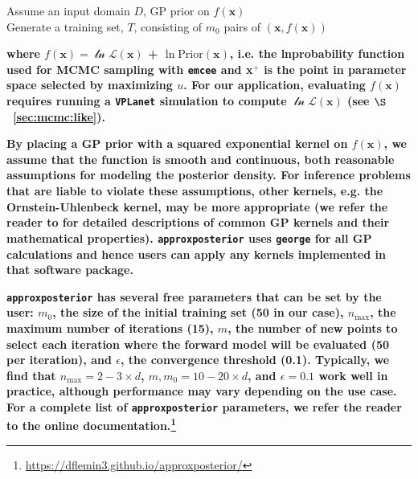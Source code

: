 \documentclass[twocolumn]{aastex62}
\newcommand{\xxx}[1]{{\textbf{#1}}}
\newcommand{\vplanet}[0]{\texttt{VPLanet}\xspace}
\newcommand{\emcee}[0]{\texttt{emcee}\xspace}
\newcommand{\approxposterior}[0]{\texttt{approxposterior}\xspace}
\begin{document}
\begin{algorithm}[H] \label{app:algo}
\SetAlgoLined
 Assume an input domain $D$, GP prior on $f(\textbf{x})$ \\
 Generate a training set, $T$, consisting of $m_0$ pairs of $(\textbf{x}, f(\textbf{x}))$ \\
\caption{\approxposterior Approximate Inference Pseudo Code}
\end{algorithm}
\xxx{where $f(\textbf{x}) = \mathcal{\ln L}(\textbf{x})$ + $\ln \mathrm{Prior}(\textbf{x})$, i.e. the lnprobability function used for MCMC sampling with \emcee and \textbf{x}$^+$ is the point in parameter space selected by maximizing $u$. For our application, evaluating $f(\textbf{x})$ requires running a \vplanet simulation to compute $\mathcal{\ln L}(\textbf{x})$ (see $\S$~\ref{sec:mcmc:like}).} 

\xxx{By placing a GP prior with a squared exponential kernel on $f(\textbf{x})$, we assume that the function is smooth and continuous, both reasonable assumptions for modeling the posterior density. For inference problems that are liable to violate these assumptions, other kernels, e.g. the Ornstein-Uhlenbeck kernel, may be more appropriate (we refer the reader to \citet{Rasmussen2006} for detailed descriptions of common GP kernels and their mathematical properties). \approxposterior uses \texttt{george} \citep{george} for all GP calculations and hence users can apply any kernels implemented in that software package.} 

\xxx{\approxposterior has several free parameters that can be set by the user: $m_0$, the size of the initial training set (50 in our case), $n_{\mathrm{max}}$, the maximum number of iterations (15), $m$, the number of new points to select each iteration where the forward model will be evaluated (50 per iteration), and $\epsilon$, the convergence threshold (0.1). Typically, we find that $n_{\mathrm{max}}=2-3 \times d$, $m, m_0 = 10-20 \times d$, and $\epsilon = 0.1$ work well in practice, although performance may vary depending on the use case. For a complete list of \approxposterior parameters, we refer the reader to the online documentation.\footnote{ \href{https://dflemin3.github.io/approxposterior}{https://dflemin3.github.io/approxposterior/}}}
\end{document}

